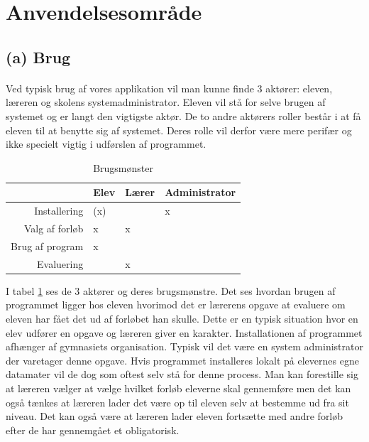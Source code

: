 \documentclass[10pt,a4paper,danish]{article}
\begin{document}
\section{Anvendelsesområde}

\subsection{(a) Brug}
\paragraph{}
Ved typisk brug af vores applikation vil man kunne finde 3 aktører: eleven, læreren og skolens systemadministrator.
Eleven vil stå for selve brugen af systemet og er langt den vigtigste aktør.
De to andre aktørers roller består i at få eleven til at benytte sig af systemet.
Deres rolle vil derfor være mere perifær og ikke specielt vigtig i udførslen af programmet.

\begin{table}[h]
  \begin{center}
    \begin{tabular}{r l l l}
      \toprule
      & Elev   & Lærer   & Administrator\\
      \midrule
      Installering    & (x)    &         & x\\
      Valg af forløb  & x      & x       &  \\
      Brug af program & x      &         &  \\
      Evaluering      &        & x       &  \\
      \bottomrule
    \end{tabular}
    \caption{Brugsmønster}
    \label{tab:brugsmoenster}
  \end{center}
\end{table}

I tabel \ref{tab:brugsmoenster} ses de 3 aktører og deres brugsmønstre.
Det ses hvordan brugen af programmet ligger hos eleven hvorimod det er lærerens opgave at evaluere om eleven har fået det ud af forløbet han skulle.
Dette er en typisk situation hvor en elev udfører en opgave og læreren giver en karakter. Installationen af programmet afhænger af gymnasiets organisation. Typisk vil det være en system administrator der varetager denne opgave. Hvis programmet installeres lokalt på elevernes egne datamater vil de dog som oftest selv stå for denne process.
Man kan forestille sig at læreren vælger at vælge hvilket forløb eleverne skal gennemføre men det kan også tænkes at læreren lader det være op til eleven selv at bestemme ud fra sit niveau. Det kan også være at læreren lader eleven fortsætte med andre forløb efter de har gennemgået et obligatorisk.
\\
\end{document}

